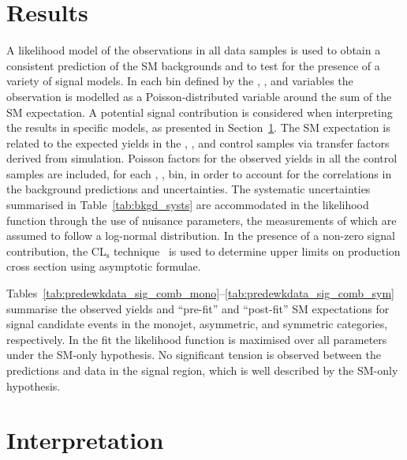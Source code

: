 \clearpage
\section{Results}
\label{sec:interpretation}

A likelihood model of the observations in all data samples is used to
obtain a consistent prediction of the SM backgrounds and to test for
the presence of a variety of signal models.  In each bin defined by
the \njet, \nb, \scalht and \mht variables the observation is modelled
as a Poisson-distributed variable around the sum of the SM
expectation. A potential signal contribution is considered when
interpreting the results in specific models, as presented in
Section~\ref{sec:interpretation}.  The SM expectation is related to
the expected yields in the \mj, \mmj, and \gj control samples via
transfer factors derived from simulation. Poisson factors for the
observed yields in all the control samples are included, for each
\njet, \nb, \scalht bin, in order to account for the correlations in
the background predictions and uncertainties.  The systematic
uncertainties summarised in Table~\ref{tab:bkgd_systs} are
accommodated in the likelihood function through the use of nuisance
parameters, the measurements of which are assumed to follow a
log-normal distribution. In the presence of a non-zero signal
contribution, the CL$_{\mathrm{s}}$ technique~\cite{read,
  Cowan:2010js} is used to determine upper limits on production cross
section using asymptotic formulae.

Tables~\ref{tab:predewkdata_sig_comb_mono}--\ref{tab:predewkdata_sig_comb_sym}
summarise the observed yields and ``pre-fit'' and ``post-fit'' SM
expectations for signal candidate events in the monojet, asymmetric,
and symmetric categories, respectively. 
In the fit the likelihood function is maximised over all parameters
under the SM-only hypothesis.
No significant tension is
observed between the predictions and data in the signal region, which
is well described by the SM-only hypothesis.


\clearpage

\clearpage

\clearpage

\section{Interpretation}

